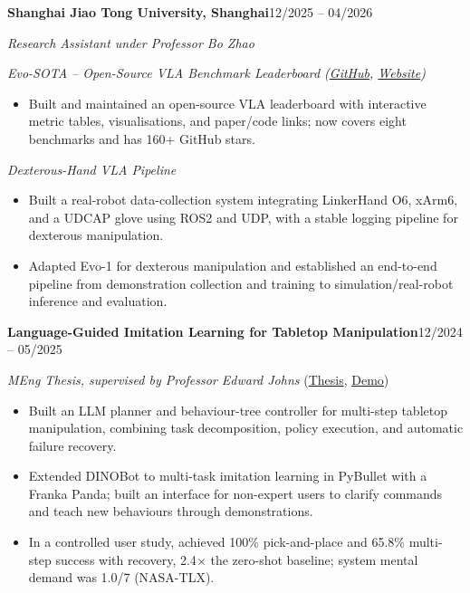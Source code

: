 \documentclass[a4paper,10pt]{article}
\newcommand{\project}[1]{\vspace{0.25em}\textit{#1}\par}
\begin{document}
\vspace{0.3em}
\textbf{Shanghai Jiao Tong University, Shanghai}\hfill 12/2025 -- 04/2026\par
\textit{Research Assistant under Professor Bo Zhao}

\project{Evo-SOTA -- Open-Source VLA Benchmark Leaderboard
(\href{https://github.com/MINT-SJTU/Evo-SOTA.io}{GitHub}, \href{https://sota.evomind-tech.com/}{Website})}
\begin{itemize}
\item Built and maintained an open-source VLA leaderboard with interactive metric tables, visualisations, and paper/code links; now covers eight benchmarks and has 160+ GitHub stars.
\end{itemize}

\project{Dexterous-Hand VLA Pipeline}
\begin{itemize}
\item Built a real-robot data-collection system integrating LinkerHand O6, xArm6, and a UDCAP glove using ROS2 and UDP, with a stable logging pipeline for dexterous manipulation.
\item Adapted Evo-1 for dexterous manipulation and established an end-to-end pipeline from demonstration collection and training to simulation/real-robot inference and evaluation.
\end{itemize}

\vspace{0.3em}
\textbf{Language-Guided Imitation Learning for Tabletop Manipulation}\hfill 12/2024 -- 05/2025\par
\textit{MEng Thesis, supervised by Professor Edward Johns}
(\href{https://drive.google.com/file/d/1K73N2DSxgWx-KpYjoMT5HGPZa2O6FDzf/view}{Thesis},
\href{https://drive.google.com/file/d/1KujpTWDKf0UbPRU1EWuXpjhngPI5dSma/view}{Demo})
\begin{itemize}
\item Built an LLM planner and behaviour-tree controller for multi-step tabletop manipulation, combining task decomposition, policy execution, and automatic failure recovery.
\item Extended DINOBot to multi-task imitation learning in PyBullet with a Franka Panda; built an interface for non-expert users to clarify commands and teach new behaviours through demonstrations.
\item In a controlled user study, achieved 100\% pick-and-place and 65.8\% multi-step success with recovery, 2.4$\times$ the zero-shot baseline; system mental demand was 1.0/7 (NASA-TLX).
\end{itemize}
\end{document}

